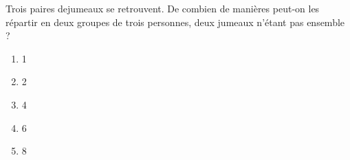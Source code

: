 Trois paires dejumeaux se retrouvent. De combien de manières peut-on
les répartir en deux groupes de trois personnes, deux jumeaux n'étant
pas ensemble ?
\begin{multicols}{5}
  \begin{enumerate}[A/]
  \item 1
  \item 2
  \item 4
  \item 6
  \item 8
  \end{enumerate}
\end{multicols}